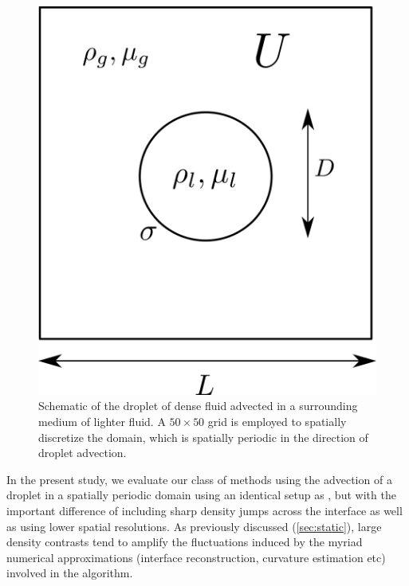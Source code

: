 \begin{figure}[h!]
    \centering
    \includegraphics[width = 1.0\textwidth]{plots/droplet_advect/config.png}
    \caption{Schematic of the droplet of dense fluid advected in a surrounding medium of lighter fluid. A $50 \times 50$ grid is employed to spatially discretize the domain, which is spatially periodic in the direction of droplet advection.}
    \label{moving_conf}
\end{figure}

In the present study, we evaluate our class of methods using the advection of a droplet in a spatially periodic domain using an identical setup as \cite{popinet2009accurate}, but with the important difference of including sharp density jumps across the interface as well as using lower spatial resolutions. As previously discussed (\ref{sec:static}), large density contrasts tend to amplify the fluctuations induced by the myriad numerical approximations (interface reconstruction, curvature estimation etc) involved in the algorithm.


